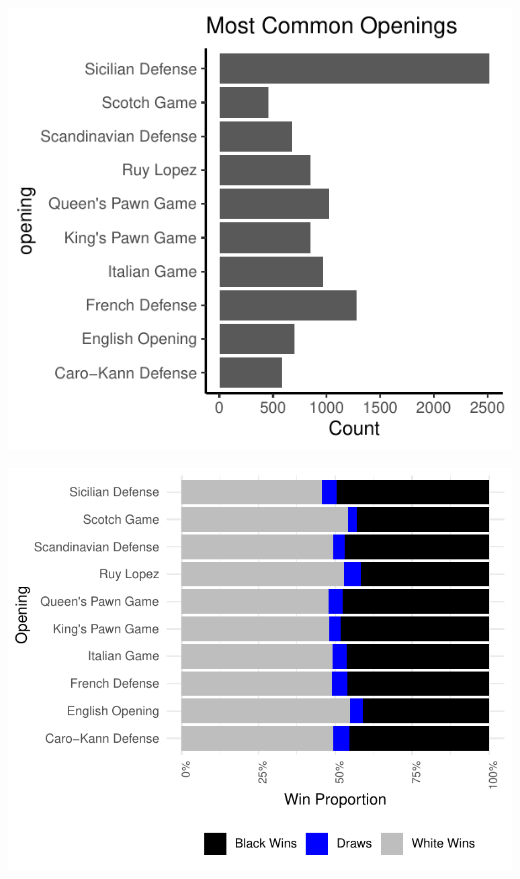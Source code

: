 \documentclass[12pt,preprint, authoryear]{elsarticle}
\let\origfigure\figure
\let\endorigfigure\endfigure
\renewenvironment{figure}[1][2] {
    \expandafter\origfigure\expandafter[H]
} {
    \endorigfigure
}
\numberwithin{equation}{section}
\numberwithin{figure}{section}
\numberwithin{table}{section}
\begin{document}
\begin{figure}[H]

{\centering \includegraphics{WriteUp_files/figure-latex/Desc4commonopen-1} 

}

\caption{Most Popular Openings\label{Figure4}}\label{fig:Desc4commonopen}
\end{figure}

\begin{figure}[H]

{\centering \includegraphics{WriteUp_files/figure-latex/openplot1-1} 

}

\caption{Outcome by Popular Openings\label{Figure5}}\label{fig:openplot1}
\end{figure}
\end{document}
